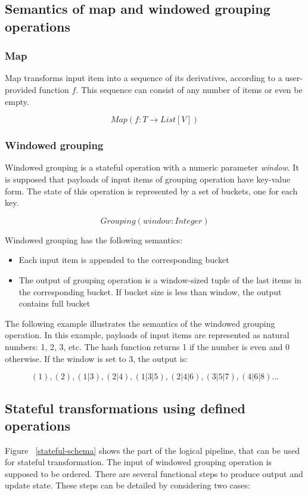 \subsection{Semantics of map and windowed grouping operations}

\subsubsection{Map}
Map transforms input item into a sequence of its derivatives, according to a user-provided function $f$. This sequence can consist of any number of items or even be empty.

\[Map(f: T \rightarrow List[V])\]

\subsubsection{Windowed grouping}
Windowed grouping is a stateful operation with a numeric parameter {\it window}. It is supposed that payloads of input items of grouping operation have key-value form. The state of this operation is represented by a set of buckets, one for each key. 

\[Grouping(window: Integer)\]

Windowed grouping has the following semantics:

\begin{itemize}
    \item Each input item is appended to the corresponding bucket
    \item The output of grouping operation is a window-sized tuple of the last items in the corresponding bucket. If bucket size is less than window, the output contains full bucket
\end{itemize}

The following example illustrates the semantics of the windowed grouping operation. In this example, payloads of input items are represented as natural numbers: 1, 2, 3, etc. The hash function returns 1 if the number is even and 0 otherwise. If the window is set to 3, the output is:

\[(1), (2), (1|3), (2|4), (1|3|5), (2|4|6), (3|5|7), (4|6|8)...\]

\subsection{Stateful transformations using defined operations}
Figure ~\ref{stateful-schema} shows the part of the logical pipeline, that can be used for stateful transformation. The input of windowed grouping operation is supposed to be ordered. There are several functional steps to produce output and update state. These steps can be detailed by considering two cases:

